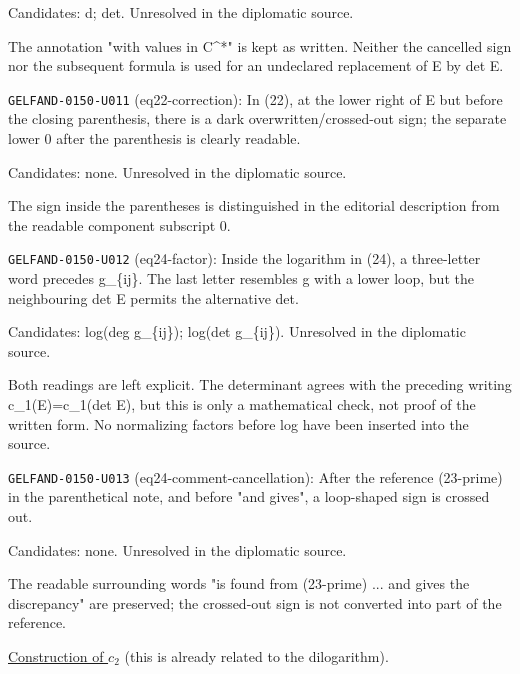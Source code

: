 Candidates: d; det. Unresolved in the diplomatic source.\par
The annotation "with values in C\textasciicircum{}*" is kept as written. Neither the cancelled sign nor the subsequent formula is used for an undeclared replacement of E by det E.\par
\noindent\texttt{GELFAND-0150-U011} (eq22-correction): In (22), at the lower right of E but before the closing parenthesis, there is a dark overwritten/crossed-out sign; the separate lower 0 after the parenthesis is clearly readable.\par
Candidates: none. Unresolved in the diplomatic source.\par
The sign inside the parentheses is distinguished in the editorial description from the readable component subscript 0.\par
\noindent\texttt{GELFAND-0150-U012} (eq24-factor): Inside the logarithm in (24), a three-letter word precedes g\_\{ij\}. The last letter resembles g with a lower loop, but the neighbouring det E permits the alternative det.\par
Candidates: log(deg g\_\{ij\}); log(det g\_\{ij\}). Unresolved in the diplomatic source.\par
Both readings are left explicit. The determinant agrees with the preceding writing c\_1(E)=c\_1(det E), but this is only a mathematical check, not proof of the written form. No normalizing factors before log have been inserted into the source.\par
\noindent\texttt{GELFAND-0150-U013} (eq24-comment-cancellation): After the reference (23-prime) in the parenthetical note, and before "and gives", a loop-shaped sign is crossed out.\par
Candidates: none. Unresolved in the diplomatic source.\par
The readable surrounding words "is found from (23-prime) ... and gives the discrepancy" are preserved; the crossed-out sign is not converted into part of the reference.\par


\underline{Construction of $c_2$} (this is already related to the dilogarithm).

